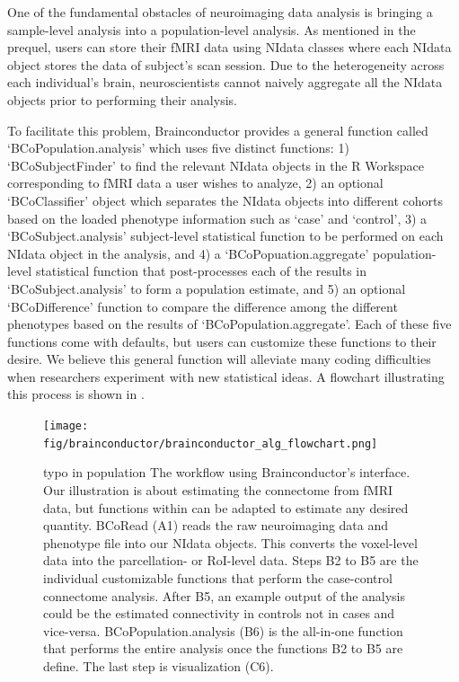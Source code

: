 \documentclass{nature}
\begin{document}
One of the fundamental obstacles of neuroimaging data analysis is bringing a
sample-level
analysis into a population-level analysis. As mentioned in the prequel, users
can
store their fMRI data using NIdata classes where each NIdata object stores the
data of
subject's scan session. Due to the heterogeneity across each individual's brain,
neuroscientists cannot naively aggregate all the NIdata objects prior to
performing their
analysis.

To facilitate this problem, Brainconductor provides a general function
called
`BCoPopulation.analysis' which uses five distinct functions: 1) `BCoSubjectFinder' to
find the relevant NIdata objects in the R Workspace corresponding to fMRI data a
user wishes
to analyze,
2) an optional `BCoClassifier' object which separates the NIdata objects into
different cohorts based on the loaded phenotype information such as `case' and
`control', 3)
a `BCoSubject.analysis' subject-level statistical function to be
performed on each NIdata object in the
analysis, and 4) a `BCoPopuation.aggregate' population-level
statistical function
that post-processes each of the results in `BCoSubject.analysis' to form a
population
estimate, and 5) an optional `BCoDifference'
function
to compare the difference among the different phenotypes based on the
results of `BCoPopulation.aggregate'. Each of these five functions come with
defaults, but users can customize these functions to their desire. We believe this general
function will alleviate many coding difficulties when researchers experiment
with
new statistical ideas. A flowchart illustrating this process is shown in
.

\begin{figure}[tb]
\centering
\texttt{[image: fig/brainconductor/brainconductor\_alg\_flowchart.png]}
\caption{ {\color{red}typo in population}
The workflow using Brainconductor's interface. Our illustration
is about estimating the connectome from fMRI data, but functions within can be
adapted to estimate any desired quantity. BCoRead (A1) reads the
raw neuroimaging
data and phenotype file into our NIdata objects. This
converts the voxel-level data into the parcellation- or RoI-level
data. Steps B2 to B5 are the individual
customizable functions that perform the case-control connectome analysis.
After B5, an example output of the analysis could be
the estimated connectivity in controls not in cases and vice-versa.
 BCoPopulation.analysis (B6) is the all-in-one function that performs the entire
analysis
once the functions B2 to B5 are define. The last step is visualization (C6).}
\label{fig:flowchart}
\end{figure}
\end{document}
